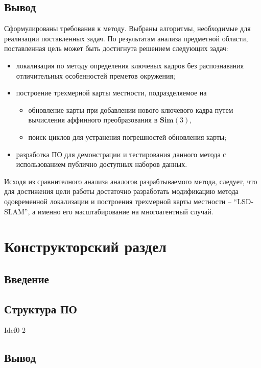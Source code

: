 \subsection{Вывод}
Сформулированы требования к методу. Выбраны алгоритмы, необходимые для реализации поставленных задач. По результатам анализа предметной области, поставленная цель может быть достигнута решением следующих задач:
\begin{itemize}
    \item локализация по методу определения ключевых кадров без распознавания отличительных особенностей преметов окружения;
    \item построение трехмерной карты местности, подразделяемое на
    \begin{itemize}
        \item обновление карты при добавлении нового ключевого кадра путем вычисления аффинного преобразования в $\textbf{Sim}(3)$,
        \item поиск циклов для устранения погрешностей обновления карты;
    \end{itemize}
    \item разработка ПО для демонстрации и тестирования данного метода с использованием публично доступных наборов данных.
\end{itemize}
Исходя из сравнителного анализа аналогов разрабтываемого метода, следует, что для достижения цели работы достаточно разработать модификацию метода одовременной локализации и построения трехмерной карты местности -- ``LSD-SLAM'', а именно его масштабирование на многоагентный случай.




\section{Конструкторский раздел}
\subsection{Введение}

\subsection{Структура ПО}
Idef0-2

\subsection{Вывод}



